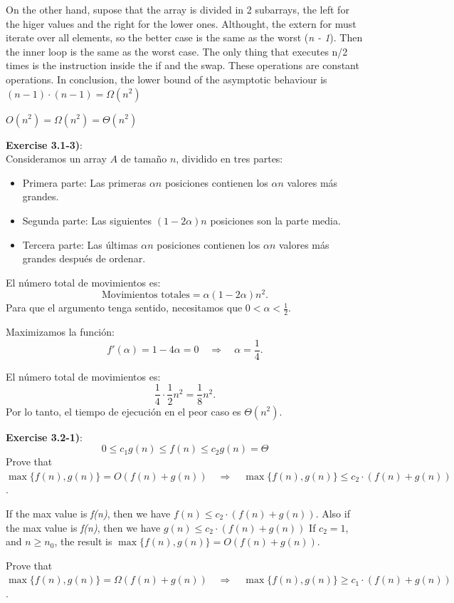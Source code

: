 \documentclass{article}
\newcounter{exercise}[section]   %
\begin{document}
On the other hand, supose that the array is divided in 2 subarrays, the left for the higer 
values and the right for the lower ones. Althought, the extern for must iterate over all
elements, so the better case is the same as the worst (\textit{n - 1}). Then the inner loop
is the same as the worst case. The only thing that executes n/2 times is the instruction 
inside the if and the swap. These operations are constant operations. In conclusion, the
lower bound of the asymptotic behaviour is \((n - 1) \cdot (n - 1) = \Omega(n^2)\)

\textbf{\(O(n^2) = \Omega(n^2) = \Theta(n^2)\)}

\textbf{Exercise 3.1-3)}:\\
Consideramos un array \(A\) de tamaño \(n\), dividido en tres partes:
\begin{itemize}
    \item Primera parte: Las primeras \(\alpha n\) posiciones contienen los \(\alpha n\) valores más grandes.
    \item Segunda parte: Las siguientes \((1 - 2\alpha)n\) posiciones son la parte media.
    \item Tercera parte: Las últimas \(\alpha n\) posiciones contienen los \(\alpha n\) valores más grandes después de ordenar.
\end{itemize}
El número total de movimientos es:
\[
\text{Movimientos totales} = \alpha(1 - 2\alpha)n^2.
\]
Para que el argumento tenga sentido, necesitamos que \(0 < \alpha < \frac{1}{2}\).

Maximizamos la función:
\[
f'(\alpha) = 1 - 4\alpha = 0 \quad \Rightarrow \quad \alpha = \frac{1}{4}.
\]

El número total de movimientos es:
\[
\frac{1}{4} \cdot \frac{1}{2} n^2 = \frac{1}{8}n^2.
\]
Por lo tanto, el tiempo de ejecución en el peor caso es \(\Theta(n^2)\).

\textbf{Exercise 3.2-1)}:
\[
0 \leq c_1g(n) \leq f(n) \leq c_2g(n) = \Theta 
\]
Prove that \(\max \{f(n), g(n)\} = O(f(n) + g(n)) \quad \Rightarrow \quad \max\{f(n),g(n)\}
\leq c_2 \cdot (f(n) + g(n))\).

If the max value is \textit{f(n)}, then we have \(f(n) \leq c_2 \cdot (f(n) + g(n))\).
Also if the max value is \textit{f(n)}, then we have \(g(n) \leq c_2 \cdot (f(n) + g(n))\)
If \(c_2 = 1\), and \(n \geq n_0\), the result is \(\max \{f(n), g(n)\} = O(f(n) + g(n))\).

Prove that \(\max \{f(n), g(n)\} = \Omega(f(n) + g(n)) \quad \Rightarrow \quad \max\{f(n),
g(n)\} \geq c_1 \cdot (f(n) + g(n))\).
\end{document}
